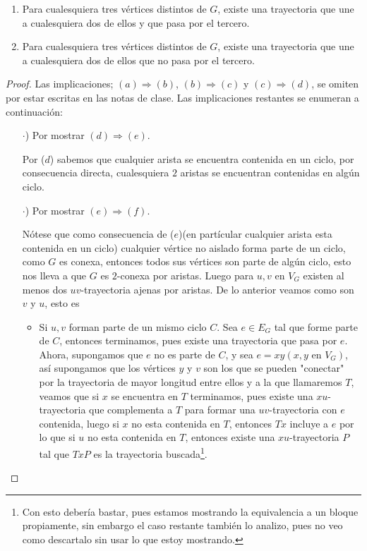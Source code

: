 \documentclass{article}
\begin{document}
\begin{enumerate}
\begin{enumerate}
  \item Para cualesquiera tres v\'ertices distintos de $G$, existe una
    trayectoria que une a cualesquiera dos de ellos y que pasa por el
    tercero.

  \item Para cualesquiera tres v\'ertices distintos de $G$, existe una
    trayectoria que une a cualesquiera dos de ellos que no pasa por el
    tercero.
  \end{enumerate}
  
  \renewcommand\qedsymbol{QED}
  \begin{proof}  
    Las implicaciones; $(a) \Rightarrow (b)$, $(b) \Rightarrow (c)$
    y $(c) \Rightarrow (d)$, se omiten por estar escritas en las
    notas de clase. Las implicaciones restantes se enumeran a
    continuación:
    \begin{itemize}
    \item[$\cdot$)] Por mostrar $(d) \Rightarrow (e)$.
      
      Por ($d$) sabemos que cualquier arista se encuentra
      contenida en un ciclo, por consecuencia directa,
      cualesquiera $2$ aristas se encuentran contenidas en
      algún ciclo.
    \item[$\cdot$)] Por mostrar $(e) \Rightarrow (f)$.
      
      Nótese que como consecuencia de ($e$)(en partícular
      cualquier arista esta contenida en un ciclo)
      cualquier vértice no aislado forma parte de un ciclo,
      como $G$ es conexa, entonces todos sus vértices son
      parte de algún ciclo, esto nos lleva a que $G$ es
      $2$-conexa por aristas. Luego para $u,v$ en $V_G$
      existen al menos dos $uv$-trayectoria ajenas por
      aristas. De lo anterior veamos como son $v$ y $u$,
      esto es
      \begin{itemize}
      \item Si $u, v$ forman parte de un mismo ciclo $C$.
        Sea $e \in E_G$ tal que forme parte de $C$, entonces
        terminamos, pues existe una trayectoria que pasa por
        $e$. Ahora, supongamos que $e$ no es parte de $C$, y
        sea $e = xy (x, y \text{ en } V_G)$, así supongamos que
        los vértices $y$ y $v$ son los que se pueden "conectar"
        por la trayectoria de mayor longitud entre ellos y a la
        que llamaremos $T$, veamos que si $x$ se encuentra en $T$
        terminamos, pues existe una $xu$-trayectoria que complementa
        a $T$ para formar una $uv$-trayectoria con $e$ contenida, luego
        si $x$ no esta contenida en $T$, entonces $Tx$ incluye a $e$ por
        lo que si $u$ no esta contenida en $T$, entonces existe una
        $xu$-trayectoria $P$ tal que $TxP$ es la trayectoria buscada\footnote{
          Con esto debería bastar, pues estamos mostrando la equivalencia
          a un bloque propiamente, sin embargo el caso restante también
          lo analizo, pues no veo como descartalo sin usar lo que estoy
          mostrando.}.
        

\end{itemize}
\end{itemize}
\end{proof}
\end{enumerate}
\end{document}
